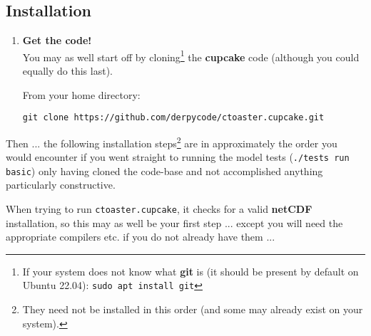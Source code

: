 \documentclass[10pt,twoside]{article}
\begin{document}
\subsection{Installation}
\vspace{1mm}

\begin{enumerate}[noitemsep]

\vspace{4pt}
\item \textbf{Get the code!}
\vspace{2pt}
\\You may as well start off by cloning\footnote{If your system does not know what \textbf{git} is (it should be present by default on Ubuntu 22.04): \texttt{sudo apt install git}} the \textbf{cupcake} code (although you could equally do this last).

From your home directory:
\vspace{-2pt}
\begin{verbatim}
git clone https://github.com/derpycode/ctoaster.cupcake.git
\end{verbatim}

\end{enumerate}

\vspace{4pt}

\noindent Then ... the following installation steps\footnote{They need not be installed in this order (and some may already exist on your system).}  are in approximately the order you would encounter if you went straight to running the model tests (\texttt{./tests run basic}) only having cloned the code-base and not accomplished anything particularly constructive.

\vspace{2pt}

\noindent When trying to run \texttt{ctoaster.cupcake}, it checks for a valid \textbf{netCDF} installation, so this may as well be your first step ... except you will need the appropriate compilers etc. if you do not already have them ... 
\end{document}
